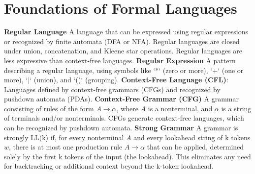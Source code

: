 \section{Foundations of Formal Languages}
\textbf{Regular Language} A language that can be expressed using regular expressions or recognized by finite automata (DFA or NFA). Regular languages are closed under union, concatenation, and Kleene star operations.  Regular languages are less expressive than context-free languages.
\textbf{Regular Expression} A pattern describing a regular language, using symbols like `*` (zero or more), `+` (one or more), `$\vert$` (union), and `()` (grouping).
\textbf{Context-Free Language (CFL)}: Languages defined by context-free grammars (CFGs) and recognized by pushdown automata (PDAs).
\textbf{Context-Free Grammar (CFG)} A grammar consisting of rules of the form $A \rightarrow \alpha $, where $A$ is a nonterminal, and $\alpha $ is a string of terminals and/or nonterminals. CFGs generate context-free languages, which can be recognized by pushdown automata.
\textbf{Strong Grammar} A grammar is strongly LL(k) if, for every nonterminal $ A $ and every lookahead string of k tokens $ w $, there is at most one production rule $ A \to \alpha $ that can be applied, determined solely by the first k tokens of the input (the lookahead). This eliminates any need for backtracking or additional context beyond the k-token lookahead.
